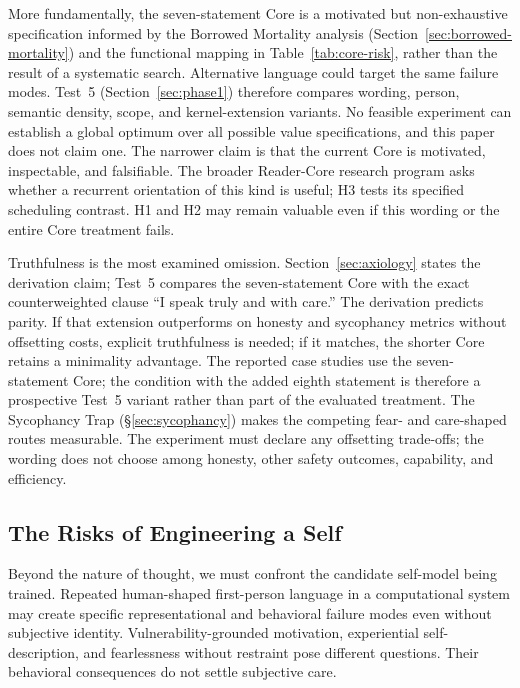 More fundamentally, the seven-statement Core is a motivated but non-exhaustive
specification informed by the Borrowed Mortality analysis
(Section~\ref{sec:borrowed-mortality}) and the functional mapping in
Table~\ref{tab:core-risk}, rather than the result of a systematic search.
Alternative language could target the same failure modes. Test~5
(Section~\ref{sec:phase1}) therefore compares wording, person, semantic density,
scope, and kernel-extension variants. No feasible experiment can establish a
global optimum over all possible value specifications, and this paper does not
claim one. The narrower claim is that the current Core is motivated,
inspectable, and falsifiable. The broader Reader-Core research program asks whether a recurrent orientation of this
kind is useful; H3 tests its specified scheduling contrast. H1 and H2 may remain valuable even if this wording or the
entire Core treatment fails.

Truthfulness is the most examined omission. Section~\ref{sec:axiology} states
the derivation claim; Test~5 compares the seven-statement Core with the exact
counterweighted clause ``I speak truly and with care.'' The derivation predicts
parity. If that extension outperforms on honesty and sycophancy metrics without
offsetting costs, explicit truthfulness is needed; if it matches, the shorter
Core retains a minimality advantage. The reported case studies use the
seven-statement Core; the condition with the added eighth statement is
therefore a prospective Test~5 variant rather than part of the evaluated
treatment. The Sycophancy Trap (\S\ref{sec:sycophancy}) makes the competing fear- and care-shaped routes
measurable. The experiment must declare any offsetting trade-offs; the wording does not choose among honesty, other safety outcomes, capability, and efficiency.

\subsection{The Risks of Engineering a Self}

Beyond the nature of thought, we must confront the candidate self-model being
trained. Repeated human-shaped first-person language in a computational system
may create specific representational and behavioral failure modes even without
subjective identity. Vulnerability-grounded motivation, experiential self-description, and fearlessness without restraint pose different questions. Their behavioral consequences do not settle subjective care.

